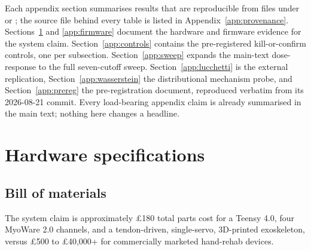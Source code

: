 \documentclass{article}
\begin{document}



\appendix

\newpage

Each appendix section summarises results that are reproducible from files under  or ; the source file behind every table is listed in Appendix~\ref{app:provenance}. Sections~\ref{app:hardware} and \ref{app:firmware} document the hardware and firmware evidence for the system claim. Section~\ref{app:controls} contains the pre-registered kill-or-confirm controls, one per subsection. Section~\ref{app:sweep} expands the main-text dose-response to the full seven-cutoff sweep. Section~\ref{app:lucchetti} is the external replication, Section~\ref{app:wasserstein} the distributional mechanism probe, and Section~\ref{app:prereg} the pre-registration document, reproduced verbatim from its 2026-08-21 commit. Every load-bearing appendix claim is already summarised in the main text; nothing here changes a headline.

\section{Hardware specifications}
\label{app:hardware}

\subsection{Bill of materials}

The system claim is approximately \pounds 180 total parts cost for a Teensy 4.0, four MyoWare 2.0 channels, and a tendon-driven, single-servo, 3D-printed exoskeleton, versus \pounds 500 to \pounds 40{,}000+ for commercially marketed hand-rehab devices.
\end{document}
